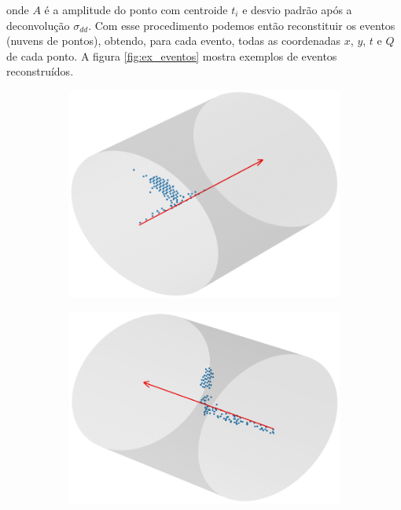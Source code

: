 \documentclass[a4paper,12pt,oneside]{book}
\begin{document}
\par onde $A$ é a amplitude do ponto com centroide $t_i$ e desvio padrão após a deconvolução $\sigma_{dd}$. Com esse procedimento podemos então reconstituir os eventos (nuvens de pontos), obtendo, para cada evento, todas as coordenadas $x$, $y$, $t$ e $Q$ de cada ponto. A figura \ref{fig:ex_eventos} mostra exemplos de eventos reconstruídos.

\begin{figure}[H]
\centering
    \begin{subfigure}[b]{0.48\textwidth}
        \centering
        \includegraphics[scale=0.38]{figs/ex_ev_1.png}
        \caption{}
        \label{subfig:ex_ev_1}
    \end{subfigure}%
    \hfill
    \begin{subfigure}[b]{0.48\textwidth}
        \centering
        \includegraphics[scale=0.38]{figs/ex_ev_2.png}

\end{subfigure}
\end{figure}
\end{document}
